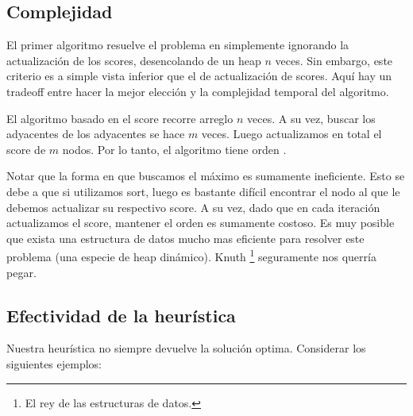 \subsection{Complejidad}

El primer algoritmo resuelve el problema en  simplemente ignorando la actualización de los scores, desencolando de un heap $n$ veces. Sin embargo, este criterio es a simple vista inferior que el de actualización de scores. Aquí hay un tradeoff entre hacer la mejor elección y la complejidad temporal del algoritmo.

El algoritmo basado en el score recorre arreglo $n$ veces. A su vez, buscar los adyacentes de los adyacentes se hace $m$ veces. Luego actualizamos en total el score de $m$ nodos. Por lo tanto, el algoritmo tiene orden .

Notar que la forma en que buscamos el máximo es sumamente ineficiente. Esto se debe a que si utilizamos sort, luego es bastante difícil encontrar el nodo al que le debemos actualizar su respectivo score. A su vez, dado que en cada iteración actualizamos el score, mantener el orden es sumamente costoso. Es muy posible que exista una estructura de datos mucho mas eficiente para resolver este problema (una especie de heap dinámico). Knuth \footnote{El rey de las estructuras de datos.} seguramente nos querría pegar.

\pagebreak

\subsection{Efectividad de la heurística}

Nuestra heurística no siempre devuelve la solución optima. Considerar los siguientes ejemplos:

